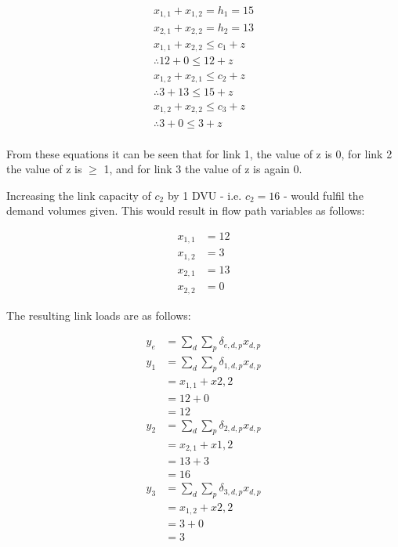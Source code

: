 \begin{align*}
	x_{1,1} + x_{1,2} = h_1 = 15 \\
	x_{2,1} + x_{2,2} = h_2 = 13 \\
	x_{1,1} + x_{2,2} \le c_1 + z \\
	\therefore 12 + 0 \le 12 + z \\
	x_{1,2} + x_{2,1} \le c_2 + z \\
	\therefore 3 + 13 \le 15 + z \\
	x_{1,2} + x_{2,2} \le c_3 + z \\
	\therefore 3 + 0 \le 3 + z \\
\end{align*}

From these equations it can be seen that for link 1, the value of z is 0, for
link 2 the value of z is $\ge$ 1, and for link 3 the value of z is again 0.

Increasing the link capacity of $c_2$ by 1 DVU - i.e. $c_2 = 16$ - would fulfil
the demand volumes given. This would result in flow path variables as follows:

 \begin{align*}
	 x_{1,1} &= 12 \\
	 x_{1,2} &= 3 \\
	 x_{2,1} &= 13 \\
	 x_{2,2} &= 0
\end{align*}

The resulting link loads are as follows:

\begin{align*}
	y_e &= \sum_{d}\sum_{p} \delta_{e,d,p}x_{d,p} \\
	y_1 &= \sum_{d}\sum_{p}\delta_{1,d,p}x_{d,p} \\
	    &= x_{1,1}+x{2,2} \\
	    &= 12 + 0 \\
	    &= 12 \\
	y_2 &= \sum_{d}\sum_{p}\delta_{2,d,p}x_{d,p} \\
	    &= x_{2,1}+x{1,2} \\
	    &= 13 + 3 \\
	    &= 16 \\
	y_3 &= \sum_{d}\sum_{p}\delta_{3,d,p}x_{d,p} \\
	    &= x_{1,2}+x{2,2} \\
	    &= 3 + 0 \\
	    &= 3
\end{align*}
